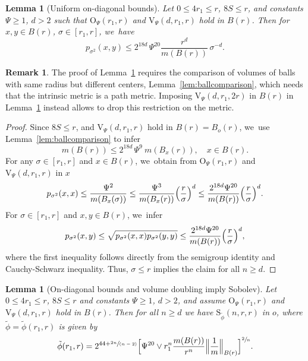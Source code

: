 \documentclass[10pt]{amsart}
\newcommand{\spfrac}[2]{\sfrac{#1}{(#2)}}
\newcommand{\rS}{\mathrm{S}}
\newcommand{\rV}{\mathrm{V}}
\newcommand{\rO}{\mathrm{O}}
\theoremstyle{plain}
\newtheorem{lemma}[theorem]{Lemma}
\theoremstyle{definition}
\newtheorem*{remark}{Remark}
\begin{document}
\begin{lemma}[Uniform on-diagonal bounds]\label{lem:heattosob}
Let
$0\leq {4}r_1\leq r$, $8S\leq r$, and constants $\Psi\geq 1$, $d>2$ such that $\rO_\Psi(r_1,r)$
and $\rV_\Psi (d,r_1,r)$ hold in $B(r)$.
Then for $x,y\in B(r)$, $\sigma\in[r_1,r]$, we~have
\[
p_{\sigma^2}(x,y)
\leq
2^{18d}\,\Psi^{20}
\frac{r^{d}}{m(B(r))}\,\sigma^{-{d}}.
\]
\end{lemma}
\begin{remark}The proof of Lemma~\ref{lem:heattosob} requires the comparison of volumes of balls with same radius but different centers, Lemma~\ref{lem:ballcomparison}, which needs that the intrinsic metric is a path metric. Imposing $\rV_\Psi (d,r_1,2r)$ in $B(r)$ in Lemma~\ref{lem:heattosob} instead allows to drop this restriction on the metric.
\end{remark}
\begin{proof} Since $8S\leq r$,
and $\rV_\Psi (d,r_1,r)$ hold in $B(r)=B_o(r)$, we~use Lemma~\ref{lem:ballcomparison} to infer
\[
m(B(r))\leq 2^{18d}\,\Psi^9\ m(B_x(r)), \quad x\in B(r).
\]
For any $\sigma\in[r_1,r]$ and $x\in B(r)$, we~obtain from $\rO_{\Psi}(r_1,r)$ and $\rV_\Psi (d, r_1,r)$ in $x$
\begin{align*}
p_{\sigma^{2}}(x,x)\leq \frac{\Psi^2}{m(B_x(\sigma))}
\leq
\frac{\Psi^3 }{m(B_x(r))}\Bigl(\frac{r}{\sigma}\Bigr)^{d}
\leq
\frac{2^{18d}\Psi^{20}}{m(B(r))} \Bigl(\frac{r}{\sigma}\Bigr)^{{d}}.
\end{align*}
For $\sigma\in[r_1,r]$ and $x,y\in B(r)$, we~infer
\[
p_{\sigma^2}(x,y)\leq \sqrt{p_{\sigma^2}(x,x)p_{\sigma^2}(y,y)}
\leq
\frac{2^{18d}\Psi^{20}}{m(B(r))}\Bigl(\frac{r}{\sigma}\Bigr)^{{d}},
\]
where the first inequality follows directly from the semigroup identity and Cauchy-Schwarz inequality.
Thus, $\sigma\leq r$ implies the claim for all $n\geq d$.
\end{proof}

\begin{lemma}[On-diagonal bounds and volume doubling imply Sobolev]\label{lem:heattosob3}
Let
$0\leq {4} r_1\leq r$, $8S\leq r$ and constants $\Psi\geq 1$, $d>2$, and assume $\rO_\Psi(r_1,r)$ and
$\rV_\Psi (d,r_1,r)$ hold in $B(r)$.
Then for all $n\geq d$ we have $\rS_{\tilde \phi}(n,r,r)$ in $o$, where $\tilde \phi =\tilde \phi(r_1,r) $ is given by
\[
\tilde \phi(r_1,r)=2^{44+\spfrac{2n}{n-2}}
\Bigl[\Psi^{20}\vee r_1^n\frac{m(B(r))}{r^{n}}\Bigl\Vert\frac1m\Bigr\Vert_{B(r)}\Bigr]^{\sfrac{2}{n}}.
\]
\end{lemma}
\end{document}
